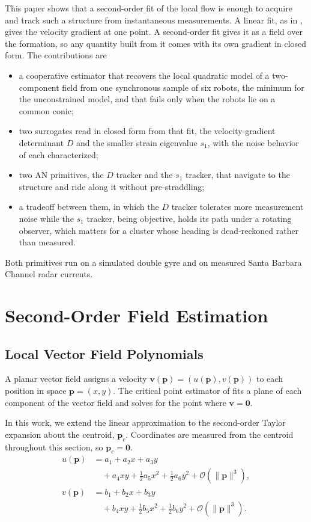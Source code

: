 \documentclass[lettersize,journal]{IEEEtran}
\begin{document}
This paper shows that a second-order fit of the local flow is enough to
acquire and track such a structure from instantaneous measurements. A
linear fit, as in \cite{8}, gives the velocity gradient at one point. A
second-order fit gives it as a field over the formation, so any quantity
built from it comes with its own gradient in closed form. The contributions are
\begin{itemize}
\item a cooperative estimator that recovers the local quadratic model of
a two-component field from one synchronous sample of six robots, the
minimum for the unconstrained model, and that fails only when the robots
lie on a common conic;
\item two surrogates read in closed form from that fit, the
velocity-gradient determinant $D$ and the smaller strain eigenvalue
$s_1$, with the noise behavior of each characterized;
\item two AN primitives, the $D$ tracker and the $s_1$ tracker, that
navigate to the structure and ride along it without pre-straddling;
\item a tradeoff between them, in which the $D$ tracker tolerates more
measurement noise while the $s_1$ tracker, being objective, holds its
path under a rotating observer, which matters for a cluster whose heading
is dead-reckoned rather than measured.
\end{itemize}

Both primitives run on a simulated double gyre and on measured Santa
Barbara Channel radar currents.

\section{Second-Order Field Estimation}

\subsection{Local Vector Field Polynomials}

A planar vector field assigns a velocity $\mathbf{v}(\mathbf{p}) =
(u(\mathbf{p}), v(\mathbf{p}))$ to each position in space $\mathbf{p} = (x, y)$.
The critical point estimator of \cite{8} fits a plane of each
component of the vector field and solves for the point where $\mathbf{v} = \mathbf{0}$. 

In this work, we extend the linear approximation to the second-order Taylor expansion about the
centroid, $\mathbf{p}_c$. Coordinates are measured
from the centroid throughout this section, so $\mathbf{p}_c = \mathbf{0}$.
\begin{align}
    u(\mathbf{p}) &= a_1 + a_2 x + a_3 y
        \nonumber \\
        &\quad + a_4 xy + \tfrac{1}{2} a_5 x^2 + \tfrac{1}{2} a_6 y^2
        + \mathcal{O}(\|\mathbf{p}\|^3),
        \label{eq:quad_model_u} \\
    v(\mathbf{p}) &= b_1 + b_2 x + b_3 y
        \nonumber \\
        &\quad + b_4 xy + \tfrac{1}{2} b_5 x^2 + \tfrac{1}{2} b_6 y^2
        + \mathcal{O}(\|\mathbf{p}\|^3).
        \label{eq:quad_model_v}
\end{align}
\end{document}
